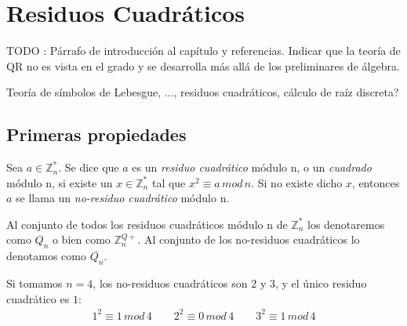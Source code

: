 \chapter{Residuos Cuadráticos}\label{ch:qr} 

TODO : Párrafo de introducción al capítulo y referencias. Indicar que la teoría de QR no es vista en el grado y se desarrolla más allá de los preliminares de álgebra.


Teoría de símbolos de Lebesgue, ..., residuos cuadráticos, cálculo de raíz discreta?





\section{Primeras propiedades}

\begin{definition}
	Sea $a\in \mathbb{Z}^*_n$. Se dice que $a$ es un \textit{residuo cuadrático} módulo n, o un \textit{cuadrado} módulo n, si existe un $x \in \mathbb{Z}^*_n$ tal que $x^2 \equiv a \, mod \, n$.
	Si no existe dicho $x$, entonces $a$ se llama un \textit{no-residuo cuadrático} módulo n.
	
	Al conjunto de todos los residuos cuadráticos módulo n de $\mathbb{Z}^*_n$ los denotaremos como $Q_n$ o bien como $\mathbb{Z}^{Q+}_n$.
	Al conjunto de los no-residuos cuadráticos lo denotamos como $\overline{Q_n}$.
\end{definition}

\begin{example}
	Si tomamos $n=4$, los no-residuos cuadráticos son $2$ y $3$, y el único residuo cuadrático es $1$:
	\begin{align*}
		1^2 \equiv 1 \, mod \, 4 \qquad 2^2 \equiv 0 \, mod \, 4 \qquad  3^2 \equiv 1 \, mod \, 4 
	\end{align*}
	
\end{example}


